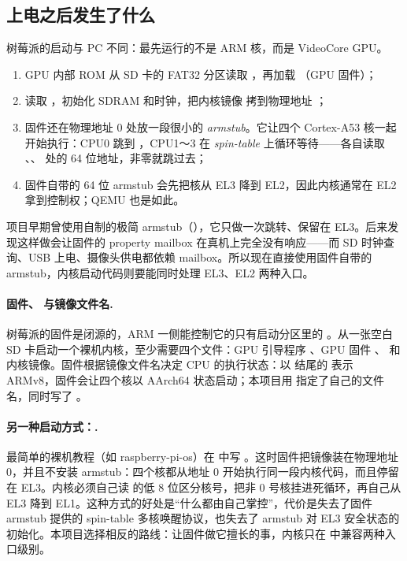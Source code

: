 \subsection{上电之后发生了什么}

树莓派的启动与 PC 不同：最先运行的不是 ARM 核，而是 VideoCore GPU。

\begin{enumerate}
  \item GPU 内部 ROM 从 SD 卡的 FAT32 分区读取 ，再加载 （GPU 固件）；
  \item {} 读取 ，初始化 SDRAM 和时钟，把内核镜像  拷到物理地址 ；
  \item 固件还在物理地址 0 处放一段很小的 \emph{armstub}。它让四个 Cortex-A53 核一起开始执行：CPU0 跳到 ，CPU1～3 在 \emph{spin-table} 上循环等待——各自读取 、、 处的 64 位地址，非零就跳过去；
  \item 固件自带的 64 位 armstub 会先把核从 EL3 降到 EL2，因此内核通常在 EL2 拿到控制权；QEMU 也是如此。
\end{enumerate}

项目早期曾使用自制的极简 armstub（），它只做一次跳转、保留在 EL3。后来发现这样做会让固件的 property mailbox 在真机上完全没有响应——而 SD 时钟查询、USB 上电、摄像头供电都依赖 mailbox。所以现在直接使用固件自带的 armstub，内核启动代码则要能同时处理 EL3、EL2 两种入口。

\paragraph{固件、 与镜像文件名.} 树莓派的固件是闭源的，ARM 一侧能控制它的只有启动分区里的 。从一张空白 SD 卡启动一个裸机内核，至少需要四个文件：GPU 引导程序 、GPU 固件 、 和内核镜像。固件根据镜像文件名决定 CPU 的执行状态：以  结尾的  表示 ARMv8，固件会让四个核以 AArch64 状态启动；本项目用  指定了自己的文件名，同时写了 。

\paragraph{另一种启动方式：.} 最简单的裸机教程（如 raspberry-pi-os\cite{rpios}）在  中写 。这时固件把镜像装在物理地址 0，并且不安装 armstub：四个核都从地址 0 开始执行同一段内核代码，而且停留在 EL3。内核必须自己读  的低 8 位区分核号，把非 0 号核挂进死循环，再自己从 EL3 降到 EL1。这种方式的好处是“什么都由自己掌控”，代价是失去了固件 armstub 提供的 spin-table 多核唤醒协议，也失去了 armstub 对 EL3 安全状态的初始化。本项目选择相反的路线：让固件做它擅长的事，内核只在  中兼容两种入口级别。

